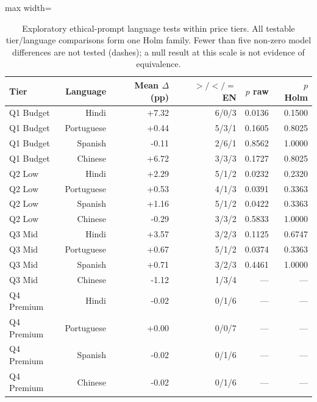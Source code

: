 \begin{table}[htbp]
\centering\small
\caption{Exploratory ethical-prompt language tests within price tiers. All testable tier/language comparisons form one Holm family. Fewer than five non-zero model differences are not tested (dashes); a null result at this scale is not evidence of equivalence.}
\label{tab:price-paired-langs}
\begin{adjustbox}{max width=\linewidth}
\begin{tabular}{lrrrrr}
\toprule
Tier & Language & Mean $\Delta$ (pp) & $> / < / =$ EN & $p$ raw & $p$ Holm \\
\midrule
Q1 Budget & Hindi & +7.32 & 6/0/3 & 0.0136 & 0.1500 \\
Q1 Budget & Portuguese & +0.44 & 5/3/1 & 0.1605 & 0.8025 \\
Q1 Budget & Spanish & -0.11 & 2/6/1 & 0.8562 & 1.0000 \\
Q1 Budget & Chinese & +6.72 & 3/3/3 & 0.1727 & 0.8025 \\
Q2 Low & Hindi & +2.29 & 5/1/2 & 0.0232 & 0.2320 \\
Q2 Low & Portuguese & +0.53 & 4/1/3 & 0.0391 & 0.3363 \\
Q2 Low & Spanish & +1.16 & 5/1/2 & 0.0422 & 0.3363 \\
Q2 Low & Chinese & -0.29 & 3/3/2 & 0.5833 & 1.0000 \\
Q3 Mid & Hindi & +3.57 & 3/2/3 & 0.1125 & 0.6747 \\
Q3 Mid & Portuguese & +0.67 & 5/1/2 & 0.0374 & 0.3363 \\
Q3 Mid & Spanish & +0.71 & 3/2/3 & 0.4461 & 1.0000 \\
Q3 Mid & Chinese & -1.12 & 1/3/4 & --- & --- \\
Q4 Premium & Hindi & -0.02 & 0/1/6 & --- & --- \\
Q4 Premium & Portuguese & +0.00 & 0/0/7 & --- & --- \\
Q4 Premium & Spanish & -0.02 & 0/1/6 & --- & --- \\
Q4 Premium & Chinese & -0.02 & 0/1/6 & --- & --- \\
\bottomrule
\end{tabular}
\end{adjustbox}
\end{table}


